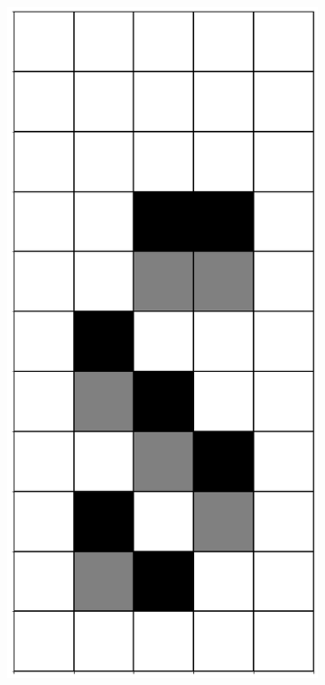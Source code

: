 \documentclass[12pt]{article}
\numberwithin{figure}{section} %
\begin{document}
\begin{figure}[H]
\begin{subfigure}{0.3\textwidth}
     		\includegraphics[angle=270,width=\linewidth]{Section4/4.0}
     		\subcaption{}

\end{subfigure}
\end{figure}
\end{document}
